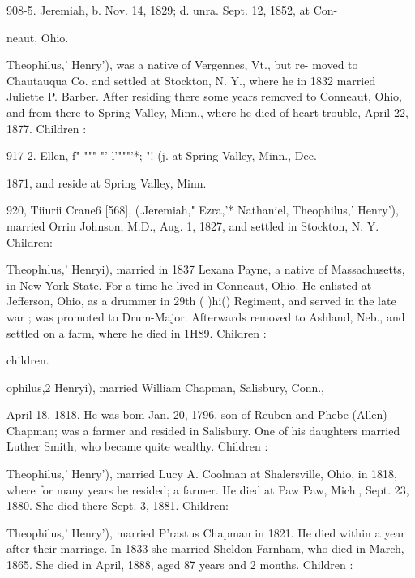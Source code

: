 \documentclass[oneside]{book}
\begin{document}
908-5. Jeremiah, b. Nov. 14, 1829; d. unra. Sept. 12, 1852, at Con- 

neaut, Ohio. 







Theophilus,' Henry'), was a native of Vergennes, Vt., but re- 
moved to Chautauqua Co. and settled at Stockton, N. Y., where 
he in 1832 married Juliette P. Barber. After residing there some 
years removed to Conneaut, Ohio, and from there to Spring Valley, 
Minn., where he died of heart trouble, April 22, 1877. Children : 


917-2. Ellen, f" """ "' l'"""'*; "! (j. at Spring Valley, Minn., Dec. 



1871, and reside at Spring Valley, Minn. 

920, Tiiurii Crane6 [568], (.Jeremiah," Ezra,'* Nathaniel,  
Theophilus,' Henry'), married Orrin Johnson, M.D., Aug. 1, 
1827, and settled in Stockton, N. Y. Children: 



Theoplnlus,' Henryi), married in 1837 Lexana Payne, a native 
of Massachusetts, in New York State. For a time he lived in 
Conneaut, Ohio. He enlisted at Jefferson, Ohio, as a drummer 
in 29th ( )hi() Regiment, and served in the late war ; was promoted 
to Drum-Major. Afterwards removed to Ashland, Neb., and 
settled on a farm, where he died in 1H89. Children : 


children. 

ophilus,2 Henryi), married William Chapman, Salisbury, Conn., 




April 18, 1818. He was bom Jan. 20, 1796, son of Reuben and 
Phebe (Allen) Chapman; was a farmer and resided in Salisbury. 
One of his daughters married Luther Smith, who became quite 
wealthy. Children : 









Theophilus,' Henry'), married Lucy A. Coolman at Shalersville, 
Ohio, in 1818, where for many years he resided; a farmer. He 
died at Paw Paw, Mich., Sept. 23, 1880. She died there Sept. 
3, 1881. Children: 





Theophilus,' Henry'), married P'rastus Chapman in 1821. He 
died within a year after their marriage. In 1833 she married 
Sheldon Farnham, who died in March, 1865. She died in April, 
1888, aged 87 years and 2 months. Children : 
\end{document}
